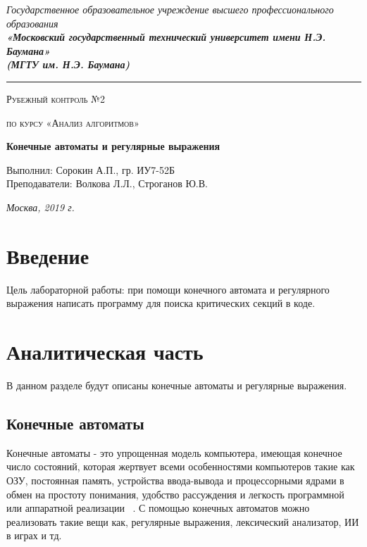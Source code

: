 \documentclass[12pt, a4paper]{report}
\begin{document}
    \begin{titlepage}

        \begin{center}
            \Large
            {\sl Государственное образовательное учреждение высшего профессионального образования\\
            {\bf«Московский государственный технический университет имени Н.Э. Баумана»\\
				(МГТУ им. Н.Э. Баумана)}}
				\noindent\rule{\textwidth}{2pt}
            \vspace{3cm}

			{\scshape\LARGE Рубежный контроль №2 \par}
			\vspace{0.5cm}	
			{\scshape\LARGE по курсу «Анализ алгоритмов» \par}
			\vspace{1.5cm}
			{\huge\bfseries Конечные автоматы и регулярные выражения \par}
			\vspace{2cm}
			\Large Выполнил: Сорокин А.П., гр. ИУ7-52Б\\
			\vspace{0.5cm}
			{\Large Преподаватели: Волкова Л.Л., Строганов Ю.В.}
		
			\vfill
			\Large \textit {Москва, 2019 г.}
            
        \end{center}

    \end{titlepage}
	
	\tableofcontents

	\chapter*{Введение}
	Цель лабораторной работы: при помощи конечного автомата и регулярного выражения
	написать программу для поиска критических секций в коде.

    \chapter{Аналитическая часть}
	В данном разделе будут описаны конечные автоматы и регулярные выражения.
	
	\section{Конечные автоматы}
	Конечные автоматы - это упрощенная модель компьютера, имеющая конечное
	число состояний, которая жертвует всеми особенностями компьютеров такие как ОЗУ,
	постоянная память, устройства ввода-вывода и процессорными ядрами в обмен на простоту
	понимания, удобство рассуждения и легкость программной или аппаратной реализации ~\cite{ka}.
	С помощью конечных автоматов можно реализовать такие вещи как, регулярные выражения, лексический анализатор, ИИ в играх и тд.
\end{document}

